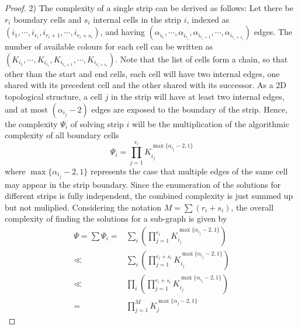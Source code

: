 \documentclass[journal]{IEEEtran}
\begin{document}
\begin{proof}
2) The complexity of a single strip can be derived as follows: Let there be $r_i$ boundary cells and $s_i$ internal cells in the strip $i$, 
indexed as $( i_1, \cdots, i_{r_i}, i_{r_i+1}, \cdots, i_{r_i+s_i})$, 
and having $(\alpha_{i_1}, \cdots, \alpha_{i_{r_i}}, \alpha_{i_{r_i+1}}, \cdots, \alpha_{i_{r_i+s_i}})$ edges. 
The number of available colours for each cell can be  written as $(K_{i_1}, \cdots, K_{i_{r_i}}, K_{i_{r_i+1}}, \cdots, K_{i_{r_i+s_i}})$. 
Note that the list of cells form a chain, so that other than the start and end cells, each cell will have two internal edges, one shared with its precedent cell and the 
other shared with its successor. As a 2D topological structure, a cell $j$ in the strip %
will have at least two internal edges, and at most $(\alpha_{i_j}-2)$ edges are exposed to the boundary of the strip. 
Hence, the complexity $\Psi_i$  of solving strip $i$ will be the multiplication of the algorithmic complexity of all boundary cells 
\begin{equation}
\Psi_i = \prod\limits_{j = 1}^{r_i} K_{i_j}^{\max\{\alpha_{i_j}-2, 1\}}
\end{equation}
where $\max\{\alpha_{i_j}-2, 1\}$ represents the case that multiple edges of the same cell may appear in the strip boundary. 
Since the enumeration of the solutions for different strips is fully independent, the combined complexity is just summed up but not muliplied. 
Considering the notation $M = \sum (r_i+s_i)$, the overall complexity of finding the solutions for a sub-graph is given by
\begin{equation}
\begin{aligned}
\Psi = \sum \Psi_i = & \sum\limits_{i} \left(\prod\limits_{j = 1}^{r_i} K_{i_j}^{\max\{\alpha_{i_j}-2, 1\}}\right)\\
\ll & \sum\limits_{i} \left(\prod\limits_{j = 1}^{r_i+s_i} K_{i_j}^{\max\{\alpha_{i_j}-2, 1\}}\right)\\
\ll&\prod\limits_{i}\left(\prod\limits_{j = 1}^{r_i+s_i} K_{i_j}^{\max\{\alpha_{i_j}-2, 1\}}\right)\\
=&\prod\limits_{j = 1}^M K_j^{\max\{\alpha_j -2, 1\}}
\end{aligned}
\end{equation}


\end{proof}
\end{document}
